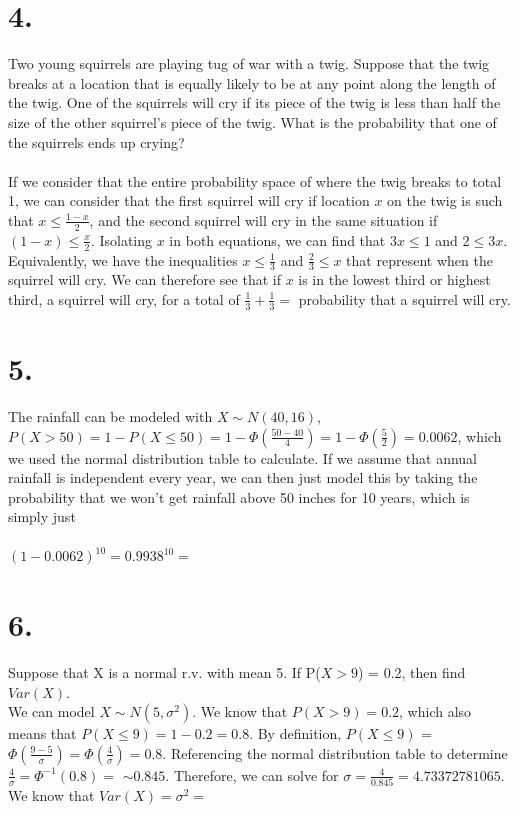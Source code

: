 \documentclass{article}
\begin{document}
\section*{4.}
{\Large 
Two young squirrels are playing tug of war with a twig. Suppose that the twig breaks at a location that is equally likely to be at any point along the length of the twig. One of the squirrels will cry if its piece of the twig is less than half the size of the other squirrel's piece of the twig. What is the probability that one of the squirrels ends up crying? \\ \\
If we consider that the entire probability space of where the twig breaks to total 1, we can consider that the first squirrel will cry if location $x$ on the twig is such that $x \leq \frac{1 - x}{2}$, and the second squirrel will cry in the same situation if $(1 - x) \leq \frac{x}{2}$. Isolating $x$ in both equations, we can find that $3x \leq 1$ and $2 \leq 3x$. Equivalently, we have the inequalities $x \leq \frac{1}{3}$ and $\frac{2}{3} \leq x$ that represent when the squirrel will cry. We can therefore see that if $x$ is in the lowest third or highest third, a squirrel will cry, for a total of $\frac{1}{3} + \frac{1}{3} =$   probability that a squirrel will cry.

}

\section*{5.}
{\Large 
The rainfall can be modeled with $X \sim N(40, 16)$, $P(X > 50) = 1 - P(X \leq 50) = 1 - \Phi(\frac{50 - 40}{4}) = 1 - \Phi(\frac{5}{2}) = 0.0062$, which we used the normal distribution table to calculate. If we assume that annual rainfall is independent every year, we can then just model this by taking the probability that we won't get rainfall above 50 inches for 10 years, which is simply just \\ \\ 
$(1 - 0.0062)^{10} = 0.9938^{10} = $ 

}

\section*{6.}
{\Large 
Suppose that X is a normal r.v. with mean 5. If P($X > 9$) = 0.2, then find $Var(X)$. \\ 
We can model $X \sim N(5, \sigma^2)$. We know that $P(X > 9) = 0.2$, which also means that $P(X \leq 9) = 1 - 0.2 = 0.8$. By definition, $P(X \leq 9)$ = $\Phi(\frac{9 - 5}{\sigma}) = \Phi(\frac{4}{\sigma}) = 0.8$. Referencing the normal distribution table to determine $\frac{4}{\sigma} = \Phi^{-1}(0.8) = $ $\sim0.845$. Therefore, we can solve for $\sigma = \frac{4}{0.845} = 4.73372781065$. We know that $Var(X) = \sigma^2 = $ 

}
\end{document}
